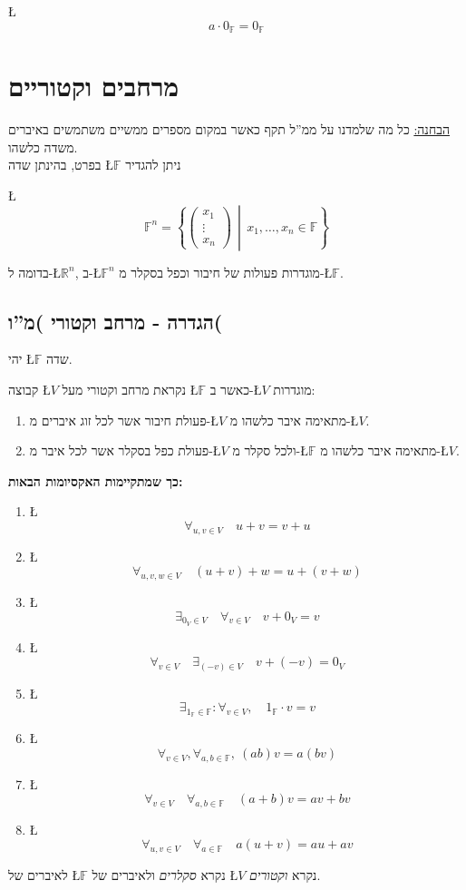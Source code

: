 \documentclass[english,hebrew]{article}
\begin{document}
\L{%
\[
a\cdot0_{\mathbb{F}}=0_{\mathbb{F}}
\]
}%

\section{מרחבים וקטוריים}

\underline{הבחנה:} כל מה שלמדנו על ממ\textquotedblright ל תקף
כאשר במקום מספרים ממשיים משתמשים באיברים משדה כלשהו.\\

בפרט, בהינתן שדה \L{$\mathbb{F}$} ניתן להגדיר

\L{%
\[
\mathbb{F}^{n}=\left\{ \begin{pmatrix}x_{1}\\
\vdots\\
x_{n}
\end{pmatrix}\,\middle|\,x_{1},\dots,x_{n}\in\mathbb{F}\right\} 
\]
}%

בדומה ל-\L{$\mathbb{R}^{n}$}, ב-\L{$\mathbb{F}^{n}$} מוגדרות פעולות
של חיבור וכפל בסקלר מ-\L{$\mathbb{F}$}.

\subsection{הגדרה - מרחב וקטורי )מ\textquotedblright ו(}

יהי \L{$\mathbb{F}$} שדה.

קבוצה \L{$V$} נקראת מרחב וקטורי מעל \L{$\mathbb{F}$} כאשר ב-\L{$V$}
מוגדרות:
\begin{enumerate}
\item פעולת חיבור אשר לכל זוג איברים מ-\L{$V$} מתאימה איבר כלשהו מ-\L{$V$}.
\item פעולת כפל בסקלר אשר לכל איבר מ-\L{$V$} ולכל סקלר מ-\L{$\mathbb{F}$}
מתאימה איבר כלשהו מ-\L{$V$}.
\end{enumerate}
\textbf{כך שמתקיימות האקסיומות הבאות:}\\

\begin{enumerate}
\item \L{%
\[
\forall_{u,v\in V}\quad u+v=v+u
\]
}%
\item \L{%
\[
\forall_{u,v,w\in V}\quad(u+v)+w=u+(v+w)
\]
}%
\item \L{%
\[
\exists_{0_{V}\in V}\quad\forall_{v\in V}\quad v+0_{V}=v
\]
}%
 
\item \L{%
\[
\forall_{v\in V}\quad\exists_{(-v)\in V}\quad v+(-v)=0_{V}
\]
}%
\item \L{%
\[
\exists_{1_{\mathbb{F}}\in\mathbb{F}}:\forall_{v\in V},\quad1_{\mathbb{F}}\cdot v=v
\]
}%
\item \L{%
\[
\forall_{v\in V},\forall_{a,b\in\mathbb{F}},\ (ab)v=a(bv)
\]
}%
\item \L{%
\[
\forall_{v\in V}\quad\forall_{a,b\in\mathbb{F}}\quad(a+b)v=av+bv
\]
}%
\item \L{%
\[
\forall_{u,v\in V}\quad\forall_{a\in\mathbb{F}}\quad a(u+v)=au+av
\]
}%
\end{enumerate}
לאיברים של \L{$\mathbb{F}$} נקרא \emph{סקלרים} ולאיברים של \L{$V$}
נקרא \emph{וקטורים}.
\end{document}

